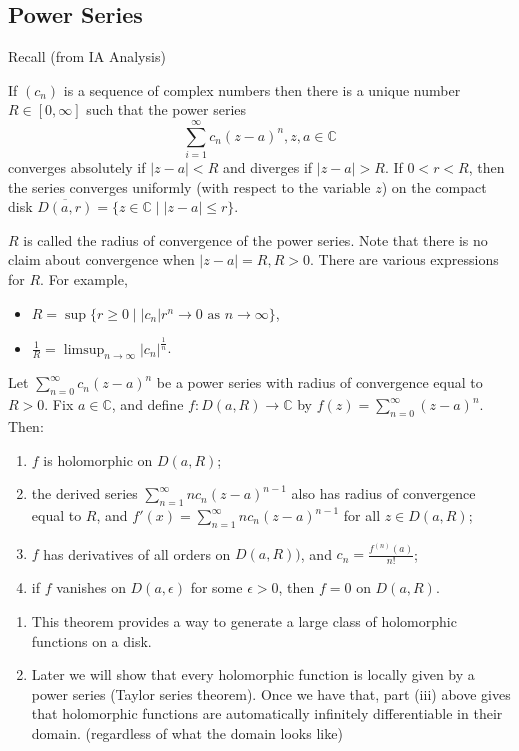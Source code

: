 \subsection{Power Series}
Recall (from IA Analysis)
\begin{theorem}
    If \((c_n)\) is a sequence of complex numbers then there is a unique number \(R \in [0, \infty]\) such that the power series
    \[
        \sum\limits_{i=1}^{\infty} c_n(z-a)^n, z,a\in\mathbb{C}
    \]
    converges absolutely if \(\left\vert z - a \right\vert <R\) and diverges if \(\left\vert z - a \right\vert > R\). If \(0<r<R\), then the series converges uniformly (with respect to the variable \(z\)) on the compact disk \(\overline{D(a, r)} = \{z\in\mathbb{C}\mid \left\vert z - a \right\vert \leq r\}\).
\end{theorem}
\(R\) is called the radius of convergence of the power series. Note that there is no claim about convergence when \(\left\vert z - a \right\vert = R, R>0\). There are various expressions for \(R\). For example,
\begin{itemize}
    \item \(R = \sup \{r \geq  0 \mid \left\vert c_n \right\vert r^n \to 0 \text{ as } n \to \infty\}\),
    \item \(\frac{1}{R} = \limsup_{n\to \infty}\left\vert c_n \right\vert^{\frac{1}{n}}\).
\end{itemize}
\begin{theorem}
    Let \(\sum\limits_{n=0}^{\infty} c_n(z-a)^n\) be a power series with radius of convergence equal to \(R > 0\). Fix \(a \in \mathbb{C}\), and define \(f: D(a, R) \to \mathbb{C}\) by \(f(z) = \sum\limits_{n=0}^{\infty} (z-a)^n\). Then:
    \begin{enumerate}
        \item \(f\) is holomorphic on \(D(a,R)\);
        \item the derived series \(\sum\limits_{n=1}^{\infty} nc_n (z-a)^{n-1}\) also has radius of convergence equal to \(R\), and \(f'(x) = \sum\limits_{n=1}^{\infty} nc_n(z-a)^{n-1}\) for all \(z \in D(a,R)\); 
        \item \(f\) has derivatives of all orders on \(D(a,R))\), and \(c_n = \frac{f^{(n)}(a)}{n!}\);
        \item if \(f\) vanishes on \(D(a,\epsilon)\) for some \(\epsilon >0\), then \(f = 0\) on \(D(a,R)\).
    \end{enumerate}
\end{theorem}
\begin{remark}
    \begin{enumerate}
    \item This theorem provides a way to generate a large class of holomorphic
    functions on a disk.
    \item Later we will show that every holomorphic function is locally given by a power series (Taylor series theorem). Once we have that, part (iii) above gives that holomorphic functions are automatically infinitely differentiable in their domain. (regardless of what the domain looks like)
    \end{enumerate}
\end{remark}
